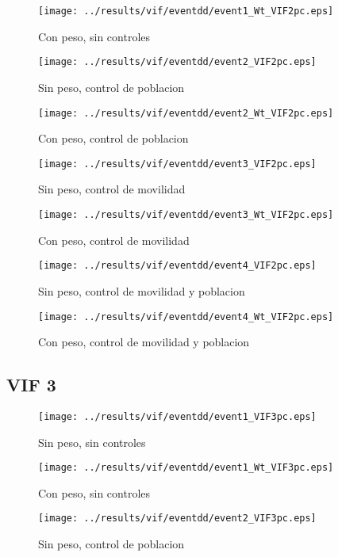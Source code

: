 \documentclass[11pt,letterpaper]{article}
\begin{document}
\begin{figure}[H]
\caption{Con peso, sin controles}
\centering
\texttt{[image: ../results/vif/eventdd/event1\_Wt\_VIF2pc.eps]}
\end{figure}
\begin{figure}[H]
\caption{Sin peso, control de poblacion}
\centering
\texttt{[image: ../results/vif/eventdd/event2\_VIF2pc.eps]}
\end{figure}

\begin{figure}[H]
\caption{Con peso, control de poblacion}
\centering
\texttt{[image: ../results/vif/eventdd/event2\_Wt\_VIF2pc.eps]}
\end{figure}
\begin{figure}[H]
\caption{Sin peso, control de movilidad}
\centering
\texttt{[image: ../results/vif/eventdd/event3\_VIF2pc.eps]}
\end{figure}

\begin{figure}[H]
\caption{Con peso, control de movilidad}
\centering
\texttt{[image: ../results/vif/eventdd/event3\_Wt\_VIF2pc.eps]}
\end{figure}
\begin{figure}[H]
\caption{Sin peso, control de movilidad y poblacion}
\centering
\texttt{[image: ../results/vif/eventdd/event4\_VIF2pc.eps]}
\end{figure}

\begin{figure}[H]
\caption{Con peso, control de movilidad y poblacion}
\centering
\texttt{[image: ../results/vif/eventdd/event4\_Wt\_VIF2pc.eps]}
\end{figure}

	\subsection{VIF 3}
\begin{figure}[H]
\caption{Sin peso, sin controles}
\centering
\texttt{[image: ../results/vif/eventdd/event1\_VIF3pc.eps]}
\end{figure}

\begin{figure}[H]
\caption{Con peso, sin controles}
\centering
\texttt{[image: ../results/vif/eventdd/event1\_Wt\_VIF3pc.eps]}
\end{figure}
\begin{figure}[H]
\caption{Sin peso, control de poblacion}
\centering
\texttt{[image: ../results/vif/eventdd/event2\_VIF3pc.eps]}
\end{figure}
\end{document}
